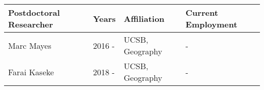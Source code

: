 
\begin{longtable}{lp{1.5cm} p{3.5cm}p{4.5cm}}
Postdoctoral Researcher & Years & Affiliation & Current Employment\\
\hline 
\endhead 
Marc Mayes & 2016 -  & UCSB, Geography &  -   \\
Farai Kaseke & 2018 -  & UCSB, Geography &  -   \\
\end{longtable}


